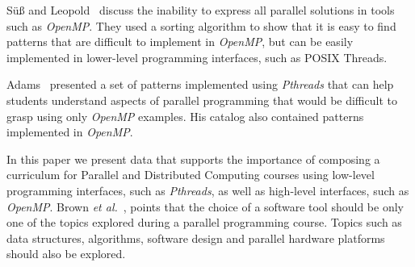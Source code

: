 Sü\ss{} and Leopold~\cite{Leopold:userOpenMP} discuss the inability to express
all parallel solutions in tools such as \textit{OpenMP}. They used a sorting
algorithm to show that it is easy to find patterns that are difficult to
implement in \textit{OpenMP}, but can be easily implemented in lower-level
programming interfaces, such as POSIX Threads.

Adams~\cite{ADAMS201731} presented a set of patterns implemented using
\textit{Pthreads} that can help students understand aspects of parallel
programming that would be difficult to grasp using only \textit{OpenMP}
examples. His catalog also contained patterns implemented in \textit{OpenMP}.


In this paper we present data that supports the importance of composing a
curriculum for Parallel and Distributed Computing courses using low-level
programming interfaces, such as \textit{Pthreads}, as well as high-level
interfaces, such as \textit{OpenMP}.  Brown \textit{et
al.}~\cite{Brown:2010:SPC:1971681.1971689}, points that the choice of a
software tool should be only one of the topics explored during a parallel
programming course. Topics such as data structures, algorithms, software design
and parallel hardware platforms should also be explored.

